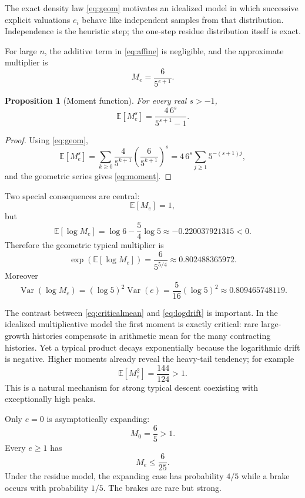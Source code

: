 \documentclass[11pt]{article}
\newtheorem{proposition}[theorem]{Proposition}
\theoremstyle{definition}
\begin{document}
The exact density law \eqref{eq:geom} motivates an idealized model in which successive explicit valuations $e_i$ behave like independent samples from that distribution. Independence is the heuristic step; the one-step residue distribution itself is exact.

For large $n$, the additive term in \eqref{eq:affine} is negligible, and the approximate multiplier is
\[
M_e=\frac{6}{5^{e+1}}.
\]

\begin{proposition}[Moment function]
For every real $s>-1$,
\begin{equation}
\mathbb E[M_e^s]
=
\frac{4\,6^s}{5^{s+1}-1}.
\label{eq:moment}
\end{equation}
\end{proposition}

\begin{proof}
Using \eqref{eq:geom},
\[
\mathbb E[M_e^s]
=
\sum_{k\ge0}
\frac4{5^{k+1}}
\left(\frac6{5^{k+1}}\right)^s
=
4\,6^s
\sum_{j\ge1}5^{-(s+1)j},
\]
and the geometric series gives \eqref{eq:moment}.
\end{proof}

Two special consequences are central:
\begin{equation}
\mathbb E[M_e]=1,
\label{eq:criticalmean}
\end{equation}
but
\begin{equation}
\mathbb E[\log M_e]
=
\log6-\frac54\log5
\approx -0.220037921315<0.
\label{eq:logdrift}
\end{equation}
Therefore the geometric typical multiplier is
\[
\exp(\mathbb E[\log M_e])
=\frac6{5^{5/4}}
\approx 0.802488365972.
\]
Moreover
\[
\operatorname{Var}(\log M_e)
=(\log5)^2\operatorname{Var}(e)
=\frac5{16}(\log5)^2
\approx 0.809465748119.
\]

The contrast between \eqref{eq:criticalmean} and \eqref{eq:logdrift} is important. In the idealized multiplicative model the first moment is exactly critical: rare large-growth histories compensate in arithmetic mean for the many contracting histories. Yet a typical product decays exponentially because the logarithmic drift is negative. Higher moments already reveal the heavy-tail tendency; for example
\[
\mathbb E[M_e^2]=\frac{144}{124}>1.
\]
This is a natural mechanism for strong typical descent coexisting with exceptionally high peaks.

Only $e=0$ is asymptotically expanding:
\[
M_0=\frac65>1.
\]
Every $e\ge1$ has
\[
M_e\le\frac6{25}.
\]
Under the residue model, the expanding case has probability $4/5$ while a brake occurs with probability $1/5$. The brakes are rare but strong.
\end{document}
